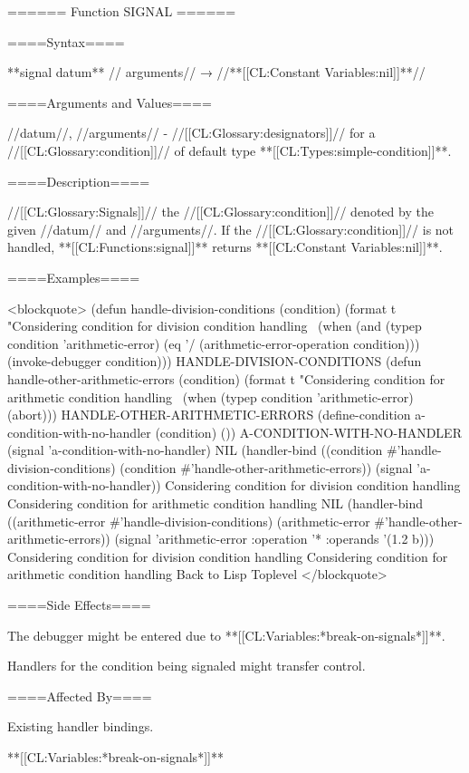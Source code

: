 ====== Function SIGNAL ======

====Syntax====

**signal {datum** //\rest} arguments// → //**[[CL:Constant Variables:nil]]**//

====Arguments and Values====

//datum//, //arguments// - //[[CL:Glossary:designators]]// for a //[[CL:Glossary:condition]]// of default type **[[CL:Types:simple-condition]]**.

====Description====

//[[CL:Glossary:Signals]]// the //[[CL:Glossary:condition]]// denoted by the given //datum// and //arguments//. If the //[[CL:Glossary:condition]]// is not handled, **[[CL:Functions:signal]]** returns **[[CL:Constant Variables:nil]]**.

====Examples====

<blockquote> (defun handle-division-conditions (condition) (format t "Considering condition for division condition handling~ (when (and (typep condition 'arithmetic-error) (eq '/ (arithmetic-error-operation condition))) (invoke-debugger condition))) HANDLE-DIVISION-CONDITIONS (defun handle-other-arithmetic-errors (condition) (format t "Considering condition for arithmetic condition handling~ (when (typep condition 'arithmetic-error) (abort))) HANDLE-OTHER-ARITHMETIC-ERRORS (define-condition a-condition-with-no-handler (condition) ()) A-CONDITION-WITH-NO-HANDLER (signal 'a-condition-with-no-handler) NIL (handler-bind ((condition #'handle-division-conditions) (condition #'handle-other-arithmetic-errors)) (signal 'a-condition-with-no-handler)) Considering condition for division condition handling Considering condition for arithmetic condition handling NIL (handler-bind ((arithmetic-error #'handle-division-conditions) (arithmetic-error #'handle-other-arithmetic-errors)) (signal 'arithmetic-error :operation '* :operands '(1.2 b))) Considering condition for division condition handling Considering condition for arithmetic condition handling Back to Lisp Toplevel </blockquote>

====Side Effects====

The debugger might be entered due to **[[CL:Variables:*break-on-signals*]]**.

Handlers for the condition being signaled might transfer control.

====Affected By====

Existing handler bindings.

**[[CL:Variables:*break-on-signals*]]**


